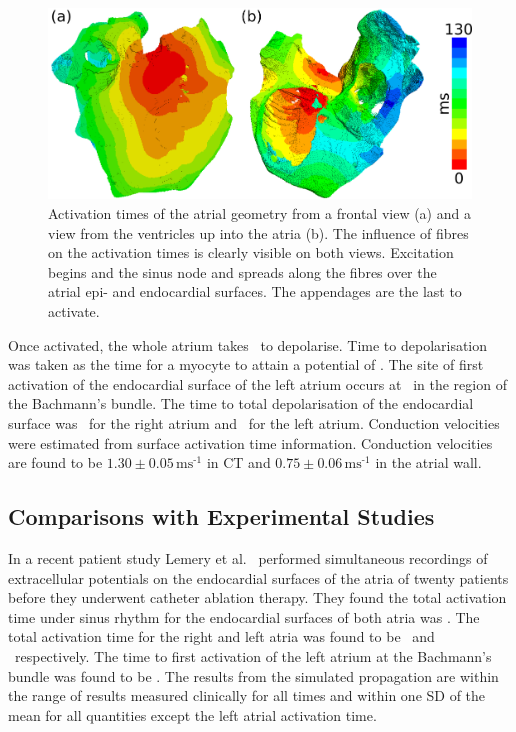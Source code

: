 \begin{figure}
\includegraphics{figures/atrium/validation/activation_times}
\caption[Activation Times Under Sinus Rhythm]{
\label{fig:atrium:validation:times}
Activation times of the atrial geometry from a frontal view (a) and a
view from the ventricles up into the atria (b).
The influence of fibres on the activation times is clearly visible on both
views.
Excitation begins and the sinus node and spreads along the fibres over the
atrial epi- and endocardial surfaces.
The appendages are the last to activate.
}
\end{figure}
Once activated, the whole atrium takes \ to depolarise.
Time to depolarisation was taken as the time for a myocyte to attain a potential
of .
The site of first activation of the endocardial surface of the left atrium
occurs at \ in the region of the Bachmann's bundle.
The time to total depolarisation of the endocardial surface was \ for
the right atrium and \ for the left atrium.
Conduction velocities were estimated from surface activation time information.
Conduction velocities are found to be $\text{1.30}\pm
0.05\,\text{ms}^{\text{-1}}$ in CT and $\text{0.75}\pm
0.06\,\text{ms}^{\text{-1}}$
in the atrial wall.


\subsection{Comparisons with Experimental Studies}

In a recent patient study Lemery et al.~\cite{Lemery2004} performed simultaneous recordings of
extracellular potentials on the endocardial surfaces of the atria of twenty
patients before they underwent catheter ablation therapy.
They found the total activation time under sinus rhythm for the endocardial
surfaces of both atria was .
The total activation time for the right and left atria was found to be \
and \ respectively.
The time to first activation of the left atrium at the Bachmann's bundle was
found to be \ms{41}.
The results from the simulated propagation are within the range of results
measured clinically for all times and within one SD of the mean for all
quantities except the left atrial activation time.


